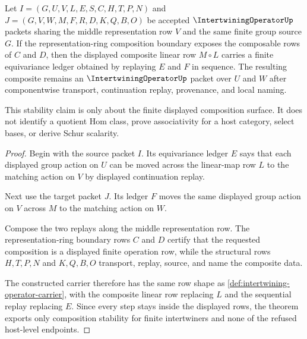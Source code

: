 \begin{theorem}
\label{thm:intertwining-operator-composition-stability}
Let $I=(G,U,V,L,E,S,C,H,T,P,N)$ and $J=(G,V,W,M,F,R,D,K,Q,B,O)$ be accepted $\IntertwiningOperatorUp$ packets sharing the middle representation row $V$ and the same finite group source $G$. If the representation-ring composition boundary exposes the composable rows of $C$ and $D$, then the displayed composite linear row $M\circ L$ carries a finite equivariance ledger obtained by replaying $E$ and $F$ in sequence. The resulting composite remains an $\IntertwiningOperatorUp$ packet over $U$ and $W$ after componentwise transport, continuation replay, provenance, and local naming.

This stability claim is only about the finite displayed composition surface. It does not identify a quotient Hom class, prove associativity for a host category, select bases, or derive Schur scalarity.
\end{theorem}
\begin{proof}
Begin with the source packet $I$. Its equivariance ledger $E$ says that each displayed group action on $U$ can be moved across the linear-map row $L$ to the matching action on $V$ by displayed continuation replay.

Next use the target packet $J$. Its ledger $F$ moves the same displayed group action on $V$ across $M$ to the matching action on $W$.

Compose the two replays along the middle representation row. The representation-ring boundary rows $C$ and $D$ certify that the requested composition is a displayed finite operation row, while the structural rows $H,T,P,N$ and $K,Q,B,O$ transport, replay, source, and name the composite data.

The constructed carrier therefore has the same row shape as \autoref{def:intertwining-operator-carrier}, with the composite linear row replacing $L$ and the sequential replay replacing $E$. Since every step stays inside the displayed rows, the theorem exports only composition stability for finite intertwiners and none of the refused host-level endpoints.
\end{proof}


